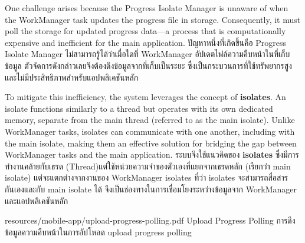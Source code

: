 \ifenglish
One challenge arises because the Progress Isolate Manager is unaware of when the WorkManager task updates the progress file in storage. Consequently, it must poll the storage for updated progress data—a process that is computationally expensive and inefficient for the main application.
\else
ปัญหาหนึ่งที่เกิดขึ้นคือ Progress Isolate Manager ไม่สามารถรู้ได้ว่าเมื่อใดที่ WorkManager อัปเดตไฟล์ความคืบหน้าในที่เก็บข้อมูล ตัวจัดการดังกล่าวเลยจึงต้องดึงข้อมูลจากที่เก็บเป็นระยะ ซึ่งเป็นกระบวนการที่ใช้ทรัพยากรสูงและไม่มีประสิทธิภาพสำหรับแอปพลิเคชันหลัก
\fi

\ifenglish
To mitigate this inefficiency, the system leverages the concept of \textbf{isolates}. An isolate functions similarly to a thread but operates with its own dedicated memory, separate from the main thread (referred to as the main isolate). Unlike WorkManager tasks, isolates can communicate with one another, including with the main isolate, making them an effective solution for bridging the gap between WorkManager tasks and the main application.
\else
ระบบจึงใช้แนวคิดของ \textbf{isolates} ซึ่งมีการทำงานคล้ายกับเธรด (Thread)แต่ใช้หน่วยความจำของตัวเองที่แยกจากเธรดหลัก (เรียกว่า main isolate) แต่จะแตกต่างจากงานของ WorkManager isolates ที่ว่า isolates จะสามารถสื่อสารกันเองและกับ main isolate ได้ จึงเป็นช่องทางในการเชื่อมโยงระหว่างข้อมูลจาก WorkManager และแอปพลิเคชันหลัก
\fi

\insertPDFfigure
{resources/mobile-app/upload-progress-polling.pdf}
{\ifenglish Upload Progress Polling \else การดึงข้อมูลความคืบหน้าในการอัปโหลด \fi}
{upload progress polling}
